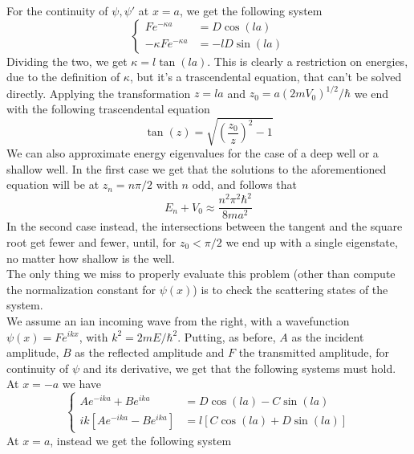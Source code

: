 \documentclass[../qm.tex]{subfiles}
\begin{document}
	For the continuity of $\psi,\psi'$ at $x=a$, we get the following system
	\begin{equation}
		\left\{ \begin{aligned}
				Fe^{-\kappa a}&=D\cos(la)\\
				-\kappa Fe^{-\kappa a}&=-lD\sin(la)
		\end{aligned}\right.
		\label{eq:leftcondition}
	\end{equation}
	Dividing the two, we get $\kappa=l\tan(la)$. This is clearly a restriction on energies, due to the definition of $\kappa$, but it's a trascendental equation, that can't be solved directly. Applying the transformation $z=la$ and $z_0=a(2mV_0)^{1/2}/\hbar$ we end with the following trascendental equation
	\begin{equation}
		\tan(z)=\sqrt{\left( \frac{z_0}{z} \right)^{2}-1}
		\label{eq:energytranscendental}
	\end{equation}
	We can also approximate energy eigenvalues for the case of a deep well or a shallow well. In the first case we get that the solutions to the aforementioned equation will be at $z_n=n\pi/2$ with $n$ odd, and follows that
	\begin{equation*}
		E_n+V_0\approx\frac{n^2\pi^2\hbar^2}{8ma^2}
	\end{equation*}
	In the second case instead, the intersections between the tangent and the square root get fewer and fewer, until, for $z_0<\pi/2$ we end up with a single eigenstate, no matter how shallow is the well.\\
	The only thing we miss to properly evaluate this problem (other than compute the normalization constant for $\psi(x)$) is to check the scattering states of the system.\\
	We assume an ian incoming wave from the right, with a wavefunction $\psi(x)=Fe^{ikx}$, with $k^2=2mE/\hbar^2$. Putting, as before, $A$ as the incident amplitude, $B$ as the reflected amplitude and $F$ the transmitted amplitude, for continuity of $\psi$ and its derivative, we get that the following systems must hold. At $x=-a$ we have
	\begin{equation}
		\left\{ \begin{aligned}
				Ae^{-ika}+Be^{ika}&=D\cos(la)-C\sin(la)\\
				ik\left[ Ae^{-ika}-Be^{ika} \right]&=l\left[ C\cos(la)+D\sin(la) \right]
		\end{aligned}\right.
		\label{eq:conditionsfinitewell}
	\end{equation}
	At $x=a$, instead we get the following system
\end{document}
